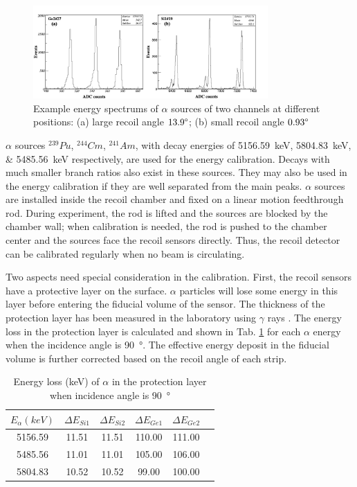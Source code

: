 \documentclass[number,5p]{elsarticle}
\begin{document}
\begin{figure}[htbp]
\centering
\includegraphics[width=0.8\textwidth]{./alpha_response.png}
\caption{Example energy spectrums of \(\alpha\) sources of two channels at different positions: (a) large recoil angle $13.9\degree$; (b) small recoil angle $0.93\degree$}
\label{fig:alpha_spectrum}
\end{figure}

\(\alpha\) sources \(^{239}Pu\), \(^{244}Cm\), \(^{241}Am\), with decay energies of \SIlist{5156.59;5804.83;5485.56}{\keV} \cite{nuclear_data} respectively, are used for the energy calibration.
Decays with much smaller branch ratios also exist in these sources. They may also be used in the energy calibration if they are well separated from the main peaks.
$\alpha$ sources are installed inside the recoil chamber and fixed on a linear motion feedthrough rod.
During experiment, the rod is lifted and the sources are blocked by the chamber wall;
when calibration is needed, the rod is pushed to the chamber center and the sources face the recoil sensors directly.
Thus, the recoil detector can be calibrated regularly when no beam is circulating.

Two aspects need special consideration in the calibration.
First, the recoil sensors have a protective layer on the surface. 
\(\alpha\) particles will lose some energy in this layer before entering the
fiducial volume of the sensor.
The thickness of the protection layer has been measured in the laboratory using \(\gamma\) rays \cite{recoil_article}.
The energy loss in the protection layer is calculated and shown in Tab. \ref{tab:dead_layer} for each $\alpha$ energy when the incidence angle is \SI{90}{\degree}.
The effective energy deposit in the fiducial volume is further corrected based
on the recoil angle of each strip.

\begin{table}[htbp]
\label{tab:dead_layer}
\caption{Energy loss (keV) of $\alpha$ in the protection layer when incidence angle is \SI{90}{\degree}}
\centering
\begin{tabular}{cccccc}
\hline
\(E_{\alpha} (keV)\) & \(\Delta E_{Si1}\) & \(\Delta E_{Si2}\) & \(\Delta E_{Ge1}\) & \(\Delta E_{Ge2}\) \\
\hline
5156.59 & 11.51 & 11.51 & 110.00 & 111.00 \\
5485.56 & 11.01 & 11.01 & 105.00 & 106.00 \\
5804.83 & 10.52 & 10.52 & 99.00  & 100.00 \\
\hline
\end{tabular}
\end{table}
\end{document}
